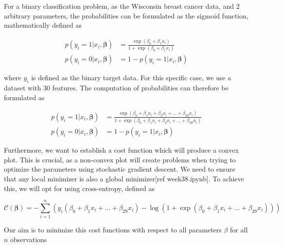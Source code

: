 \documentclass
[twocolumn,
secnumarabic,
nobibnotes,
aps,
prl,
reprint,
groupedaddress,
amsmath,
amssymb
]{revtex4-2}
\begin{document}
For a binary classification problem, as the Wisconsin breast cancer data, and 2 arbitrary parameters, the probabilities can be formulated as the sigmoid function, mathematically defined as

\begin{equation}
  \begin{aligned}
    \nonumber
    p(y_i=1|x_i,\bm{\beta}) & = \frac{\exp{(\beta_0+\beta_1x_i)}}{1+\exp{(\beta_0+\beta_1x_i)}} \\
    p(y_i=0|x_i,\bm{\beta}) & = 1 - p(y_i=1|x_i,\bm{\beta})
  \end{aligned}
\end{equation}

where $y_i$ is defined as the binary target data. For this specific case, we use a dataset with 30 features. The computation of probabilities can therefore be formulated as

\begin{equation}
  \begin{aligned}
    \nonumber
    p(y_i=1|x_i,\bm{\beta}) & = \frac{\exp{(\beta_0+\beta_1x_i + \beta_2x_i + \ldots +\beta_{29}x_i)}}{1+\exp{(\beta_0+\beta_1x_i + \beta_2x_i + \ldots +\beta_{29}x_i)}} \\
    p(y_i=0|x_i,\bm{\beta}) & = 1 - p(y_i=1|x_i,\bm{\beta})
  \end{aligned}
\end{equation}

Furthermore, we want to establish a cost function which will produce a convex plot. This is crucial, as a non-convex plot  will create problems when trying to optimize the parameters using stochastic gradient descent. We need to ensure that any local minimizer is also a global minimizer[ref week38.ipynb]. To achieve this, we will opt for using cross-entropy, defined as

\begin{widetext}
  \begin{equation}
    \label{eq:crossentropy}
    \mathcal{C}(\boldsymbol{\beta})=-\sum_{i=1}^n  \left(y_i(\beta_0+\beta_1x_i+ \ldots +\beta_{29}x_i) -\log{(1+\exp{(\beta_0+\beta_1x_i+ \ldots +\beta_{29}x_i)})}\right)
  \end{equation}
\end{widetext}

Our aim is to minimize this cost functions with respect to all parameters \(\beta\) for all $n$ observations
\end{document}
